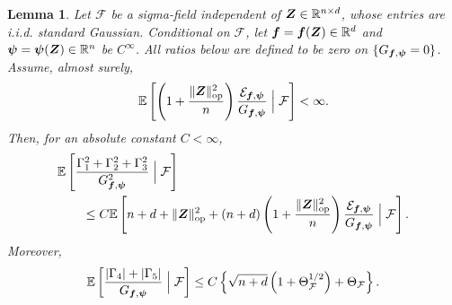 \documentclass{article}
\theoremstyle{plain} %
\newtheorem{lemma}[theorem]{Lemma}
\theoremstyle{definition} %
\theoremstyle{definition} %
\begin{document}
\begin{lemma}
\label{lem:normalized-Gaussian-Stein}
Let $\mathcal F$ be a sigma-field independent of
$\boldsymbol{Z}\in{\mathbb{R}}^{n\times d}$, whose entries are i.i.d. standard Gaussian.  Conditional
on $\mathcal F$, let $\boldsymbol{f}=\boldsymbol{f}(\boldsymbol{Z})\in{\mathbb{R}}^d$ and
$\boldsymbol\psi=\boldsymbol\psi(\boldsymbol{Z})\in{\mathbb{R}}^n$ be $C^\infty$.
All ratios below are defined to be zero on
$\{G_{\boldsymbol{f},\boldsymbol\psi}=0\}$. Assume, almost surely,
\begin{align*}
    {\mathbb{E}}\left[
       \left(1+\frac{\lVert\boldsymbol{Z}\rVert_{\rm op}^2}{n}\right)
       \frac{{\mathcal E}_{\boldsymbol{f},\boldsymbol\psi}}
            {G_{\boldsymbol{f},\boldsymbol\psi}}
       \mathrel{\Big|}\mathcal F
    \right]<\infty.
\end{align*}
Then, for an absolute constant $C<\infty$,
\begin{align}
    &{\mathbb{E}}\left[
       \frac{\Gamma_1^2+\Gamma_2^2+\Gamma_3^2}
            {G_{\boldsymbol{f},\boldsymbol\psi}^2}
       \mathrel{\Big|}\mathcal F
    \right]\notag\\
    &\qquad\leq
    C{\mathbb{E}}\left[
       n+d+\lVert\boldsymbol{Z}\rVert_{\rm op}^2
       +(n+d)\left(1+\frac{\lVert\boldsymbol{Z}\rVert_{\rm op}^2}{n}\right)
       \frac{{\mathcal E}_{\boldsymbol{f},\boldsymbol\psi}}
            {G_{\boldsymbol{f},\boldsymbol\psi}}
       \mathrel{\Big|}\mathcal F
    \right].
    \label{eq:conditional-normalized-first-order}
\end{align}
Moreover,
\begin{align}
    {\mathbb{E}}\left[
       \frac{|\Gamma_4|+|\Gamma_5|}
            {G_{\boldsymbol{f},\boldsymbol\psi}}
       \mathrel{\Big|}\mathcal F
    \right]
    \leq C\left\{
       \sqrt{n+d}\left(1+\Theta_{\mathcal F}^{1/2}\right)
       +\Theta_{\mathcal F}
    \right\}.
    \label{eq:conditional-normalized-second-order}
\end{align}
\end{lemma}
\end{document}
